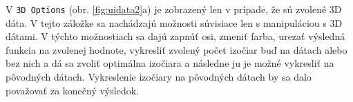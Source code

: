 \documentclass[a4paper,11pt,oneside]{article}%
\begin{document}
\begin{figure}[H]%
    \centering
    \qquad
    \caption{}%
    \label{fig:uidata1}%
\end{figure}

V \texttt{3D Options} (obr. \ref{fig:uidata2}a) je zobrazený len v prípade, že sú zvolené 3D dáta. V tejto záložke sa nachádzajú možnosti súvisiace len s manipuláciou s 3D dátami. V týchto možnostiach sa dajú zapnúť osi, zmeniť farba, urezať výsledná funkcia na zvolenej hodnote, vykresliť zvolený počet izočiar buď na dátach alebo bez nich a dá sa zvoliť optimálna izočiara a následne ju je možné vykresliť na pôvodných dátach. Vykreslenie izočiary na pôvodných dátach by sa dalo považovať za konečný výsledok.
\end{document}
